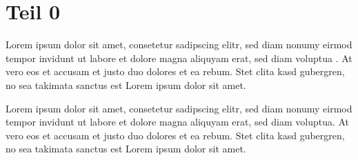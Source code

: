 %
%
%
%
\section{Teil 0\label{particles:section:teil0}}
Lorem ipsum dolor sit amet, consetetur sadipscing elitr, sed diam
nonumy eirmod tempor invidunt ut labore et dolore magna aliquyam
erat, sed diam voluptua \cite{particles:bibtex}.
At vero eos et accusam et justo duo dolores et ea rebum.
Stet clita kasd gubergren, no sea takimata sanctus est Lorem ipsum
dolor sit amet.

Lorem ipsum dolor sit amet, consetetur sadipscing elitr, sed diam
nonumy eirmod tempor invidunt ut labore et dolore magna aliquyam
erat, sed diam voluptua.
At vero eos et accusam et justo duo dolores et ea rebum.  Stet clita
kasd gubergren, no sea takimata sanctus est Lorem ipsum dolor sit
amet.


